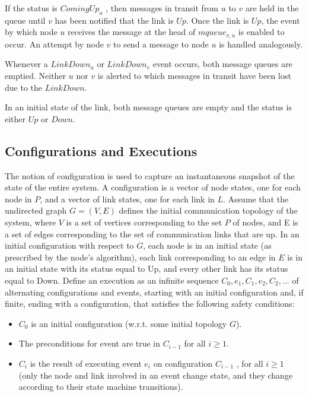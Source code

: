 \documentclass{article}
\begin{document}
If the status is $ComingUp_u$ , then messages in transit from $u$ to $v$ are held in the queue until $v$ has been notified that the link is $Up$. Once the link is $Up$, the event by which node $u$ receives the message at the head of $mqueue_{v,u}$ is enabled to occur. An attempt by node $v$ to send a message to node $u$ is handled analogously.

Whenever a $LinkDown_u$ or $LinkDown_v$ event occurs, both message queues are emptied. Neither $u$ nor $v$ is alerted to which messages in transit have been lost due to the $LinkDown$.

In an initial state of the link, both message queues are empty and the status is either $Up$ or $Down$.

\subsection{Configurations and Executions}
The notion of configuration is used to capture an instantaneous snapshot of the state of the entire system. A configuration is a vector of node states, one for each node in $P$, and a vector of link states, one for each link in $L$.
Assume that the undirected graph $G = (V, E)$ defines the initial communication topology of the system, where $V$ is a set of vertices corresponding to the set $P$ of nodes, and E is a set of edges corresponding to the set of communication links that are up. In an initial configuration with respect to $G$, each node is in an initial state (as prescribed by the node’s algorithm), each link corresponding to an edge in $E$ is in an initial state with its status equal to Up, and every other link has its status equal to Down.
Define an execution as an infinite sequence $C_0, e_1 ,C_1, e_2 ,C_2, ...$ of alternating configurations and events, starting with an initial configuration and, if finite, ending with a configuration, that satisfies the following safety conditions:
\begin{itemize}
\item $C_0$ is an initial configuration (w.r.t. some initial topology $G$).
\item The preconditions for event are true in $C_{i-1}$ for all $i\geq 1$.
\item $C_i$ is the result of executing event $e_i$ on configuration $C_{i - 1}$ , for all $i \geq 1$ (only the node and link involved in an event change state, and they change according to their state machine transitions).
\end{itemize}
\end{document}
